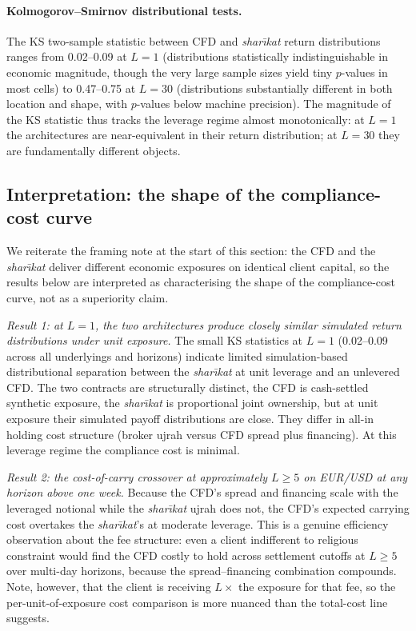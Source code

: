 \documentclass[preprint,12pt,authoryear]{elsarticle}
\theoremstyle{definition}
\begin{document}
\paragraph{Kolmogorov--Smirnov distributional tests.} The KS
two-sample statistic between CFD and \emph{shar\={\i}kat} return
distributions ranges from 0.02--0.09 at $L = 1$ (distributions
statistically indistinguishable in economic magnitude, though
the very large sample sizes yield tiny $p$-values in most cells)
to 0.47--0.75 at $L = 30$ (distributions substantially different
in both location and shape, with $p$-values below machine
precision). The magnitude of the KS statistic thus tracks the
leverage regime almost monotonically: at $L = 1$ the
architectures are near-equivalent in their return distribution;
at $L = 30$ they are fundamentally different objects.

\subsection{Interpretation: the shape of the compliance-cost curve}
\label{sec:sim-interpretation}

We reiterate the framing note at the start of this section: the
CFD and the \emph{shar\={\i}kat} deliver different economic
exposures on identical client capital, so the results below are
interpreted as characterising the shape of the compliance-cost
curve, not as a superiority claim.

\emph{Result 1: at $L = 1$, the two architectures produce
closely similar simulated return distributions under unit
exposure.} The small KS statistics at $L = 1$
(0.02--0.09 across all underlyings and horizons) indicate
limited simulation-based distributional separation between the
\emph{shar\={\i}kat} at unit leverage and an unlevered CFD.
The two contracts are structurally distinct, the CFD is
cash-settled synthetic exposure, the \emph{shar\={\i}kat} is
proportional joint ownership, but at unit exposure their
simulated payoff distributions are close. They differ in
all-in holding cost structure (broker ujrah versus CFD spread
plus financing). At this leverage regime the compliance cost is
minimal.

\emph{Result 2: the cost-of-carry crossover at approximately
$L \geq 5$ on EUR/USD at any horizon above one week.} Because the
CFD's spread and financing scale with the leveraged notional
while the \emph{shar\={\i}kat} ujrah does not, the CFD's expected
carrying cost overtakes the \emph{shar\={\i}kat}'s at moderate
leverage. This is a genuine efficiency observation about the fee
structure: even a client indifferent to religious constraint would
find the CFD costly to hold across settlement cutoffs at
$L \geq 5$ over multi-day horizons, because the spread--financing
combination compounds. Note, however, that the client is receiving
$L\times$ the exposure for that fee, so the per-unit-of-exposure
cost comparison is more nuanced than the total-cost line suggests.
\end{document}
